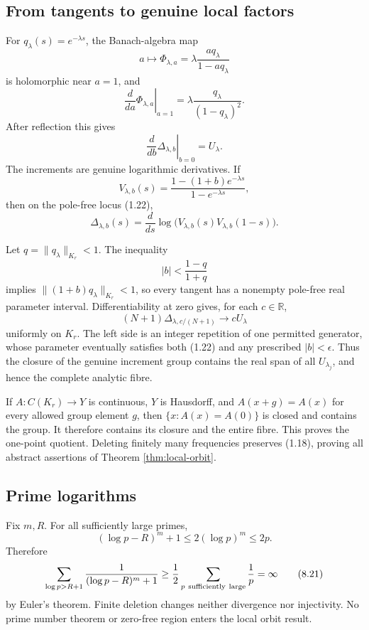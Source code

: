\documentclass[11pt]{article}
\newcommand{\R}{\mathbb R}
\begin{document}
\subsection{From tangents to genuine local factors}

For \(q_\lambda(s)=e^{-\lambda s}\), the Banach-algebra map
\[
 a\longmapsto
 \Phi_{\lambda,a}
 =\lambda\frac{a q_\lambda}{1-aq_\lambda}
\tag{8.13}
\]
is holomorphic near \(a=1\), and
\[
 \left.\frac d{da}\Phi_{\lambda,a}\right|_{a=1}
 =\lambda\frac{q_\lambda}{(1-q_\lambda)^2}.
\tag{8.14}
\]
After reflection this gives
\[
 \left.\frac d{db}\Delta_{\lambda,b}\right|_{b=0}=U_\lambda.
\tag{8.15}
\]
The increments are genuine logarithmic derivatives.  If
\[
 V_{\lambda,b}(s)=
 \frac{1-(1+b)e^{-\lambda s}}{1-e^{-\lambda s}},
\tag{8.16}
\]
then on the pole-free locus (1.22),
\[
 \Delta_{\lambda,b}(s)
 =\frac d{ds}\log\!\bigl(V_{\lambda,b}(s)V_{\lambda,b}(1-s)\bigr).
\tag{8.17}
\]

Let \(q=\|q_\lambda\|_{K_r}<1\).  The inequality
\[
 |b|<\frac{1-q}{1+q}
\tag{8.18}
\]
implies \(\|(1+b)q_\lambda\|_{K_r}<1\), so every tangent has a nonempty
pole-free real parameter interval.  Differentiability at zero gives, for each \(c\in\R\),
\[
 (N+1)\Delta_{\lambda,c/(N+1)}
 \longrightarrow cU_\lambda
\tag{8.19}
\]
uniformly on \(K_r\).  The left side is an integer repetition of one permitted generator,
whose parameter eventually satisfies both (1.22) and any prescribed \(|b|<\epsilon\).
Thus the closure of the genuine increment group contains the real span of all
\(U_{\lambda_j}\), and hence the complete analytic fibre.

If \(A:C(K_r)\to Y\) is continuous, \(Y\) is Hausdorff, and \(A(x+g)=A(x)\) for every
allowed group element \(g\), then \(\{x:A(x)=A(0)\}\) is closed and contains the group.
It therefore contains its closure and the entire fibre.  This proves the one-point quotient.
Deleting finitely many frequencies preserves (1.18), proving all abstract assertions of
Theorem \ref{thm:local-orbit}.

\subsection{Prime logarithms}

Fix \(m,R\).  For all sufficiently large primes,
\[
 (\log p-R)^m+1\le2(\log p)^m\le2p.
\tag{8.20}
\]
Therefore
\[
 \sum_{\log p>R+1}\frac1{(\log p-R)^m+1}
 \ge\frac12\sum_{p\ {\rm sufficiently\ large}}\frac1p
 =\infty
\tag{8.21}
\]
by Euler's theorem.  Finite deletion changes neither divergence nor injectivity.  No prime
number theorem or zero-free region enters the local orbit result.
\end{document}
